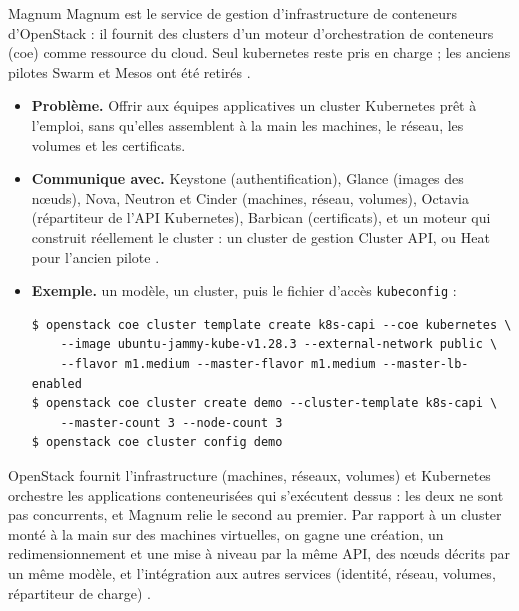 \begin{definition}{Magnum}
Magnum est le service de gestion d'infrastructure de conteneurs d'OpenStack : il fournit des clusters d'un moteur
d'orchestration de conteneurs (\gls{coe}) comme ressource du cloud. Seul \gls{kubernetes} reste pris en charge ; les anciens
pilotes Swarm et Mesos ont été retirés \parencite{magnum-user,magnum-source}.
\end{definition}

\begin{itemize}
  \item \textbf{Problème.} Offrir aux équipes applicatives un cluster Kubernetes prêt à l'emploi, sans qu'elles assemblent à
        la main les machines, le réseau, les volumes et les certificats.
  \item \textbf{Communique avec.} Keystone (authentification), Glance (images des nœuds), Nova, Neutron et Cinder (machines,
        réseau, volumes), Octavia (répartiteur de l'API Kubernetes), Barbican (certificats), et un moteur qui construit
        réellement le cluster : un cluster de gestion Cluster API, ou Heat pour l'ancien pilote
        \parencite{magnum-user,magnum-capi-helm-user}.
  \item \textbf{Exemple.} un modèle, un cluster, puis le fichier d'accès \texttt{kubeconfig} :
\begin{lstlisting}[style=terminal]
$ openstack coe cluster template create k8s-capi --coe kubernetes \
    --image ubuntu-jammy-kube-v1.28.3 --external-network public \
    --flavor m1.medium --master-flavor m1.medium --master-lb-enabled
$ openstack coe cluster create demo --cluster-template k8s-capi \
    --master-count 3 --node-count 3
$ openstack coe cluster config demo
\end{lstlisting}
\end{itemize}

\begin{remarque}[OpenStack et Kubernetes : deux niveaux]
OpenStack fournit l'infrastructure (machines, réseaux, volumes) et Kubernetes orchestre les applications conteneurisées qui
s'exécutent dessus : les deux ne sont pas concurrents, et Magnum relie le second au premier. Par rapport à un cluster monté à la
main sur des machines virtuelles, on gagne une création, un redimensionnement et une mise à niveau par la même API, des nœuds
décrits par un même modèle, et l'intégration aux autres services (identité, réseau, volumes, répartiteur de charge)
\parencite{magnum-user}.
\end{remarque}

